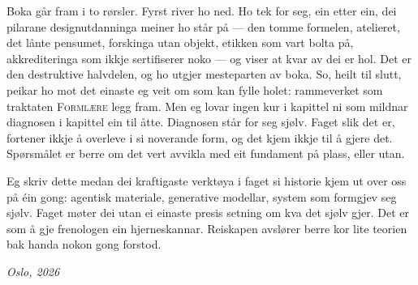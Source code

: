 Boka går fram i to rørsler. Fyrst river ho ned. Ho tek for seg, ein etter ein, dei pilarane designutdanninga meiner ho står på — den tomme formelen, atelieret, det lånte pensumet, forskinga utan objekt, etikken som vart bolta på, akkrediteringa som ikkje sertifiserer noko — og viser at kvar av dei er hol. Det er den destruktive halvdelen, og ho utgjer mesteparten av boka. So, heilt til slutt, peikar ho mot det einaste eg veit om som kan fylle holet: rammeverket som traktaten \textsc{Formlære} legg fram. Men eg lovar ingen kur i kapittel ni som mildnar diagnosen i kapittel ein til åtte. Diagnosen står for seg sjølv. Faget slik det er, fortener ikkje å overleve i si noverande form, og det kjem ikkje til å gjere det. Spørsmålet er berre om det vert avvikla med eit fundament på plass, eller utan.

Eg skriv dette medan dei kraftigaste verktøya i faget si historie kjem ut over oss på éin gong: agentisk materiale, generative modellar, system som formgjev seg sjølv. Faget møter dei utan ei einaste presis setning om kva det sjølv gjer. Det er som å gje frenologen ein hjerneskannar. Reiskapen avslører berre kor lite teorien bak handa nokon gong forstod.

\begin{flushright}\itshape
Oslo, 2026
\end{flushright}
